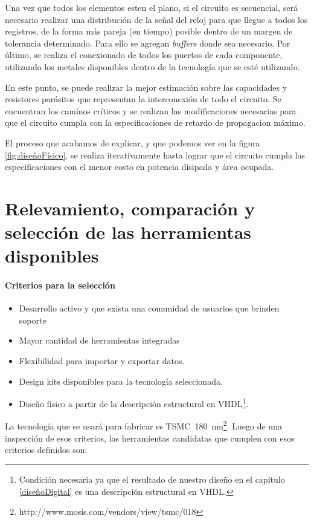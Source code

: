 Una vez que todos los elementos esten el plano, si el circuito es secuencial, será necesario realizar una distribución de la señal del reloj para que llegue a todos los registros, de la forma más pareja (en tiempo) posible dentro de un margen de tolerancia determinado. Para ello se agregan \emph{buffers} donde sea necesario. Por último, se realiza el conexionado de todos los puertos de cada componente, utilizando los metales disponibles dentro de la tecnología que se esté utilizando.

En este punto, se puede realizar la mejor estimación sobre las capacidades y resistores parásitos que representan la interconexión de todo el circuito. Se encuentran los camínos críticos y se realizan las modificaciones necesarias para que el circuito cumpla con la especificaciones de retardo de propagacion máximo.

El proceso que acabamos de explicar, y que podemos ver en la figura \ref{fig:diseñoFísico}, se realiza iterativamente hasta lograr que el circuito cumpla las especificaciones con el menor costo en potencia disipada y área ocupada.


\section{Relevamiento, comparación y selección de las herramientas disponibles}
\paragraph{Criterios para la selección}
\begin{itemize}
\item Desarrollo activo y que exista una comunidad de usuarios que brinden soporte
\item Mayor cantidad de herramientas integradas
\item Flexibilidad para importar y exportar datos. 
\item Design kits disponibles para la tecnología seleccionada.
\item Diseño físico a partir de la descripción estructural en VHDL\footnote{Condición necesaria ya que el resultado de nuestro diseño en el capítulo \ref{diseñoDigital} es una descripción estructural en VHDL.}.
\end{itemize}

La tecnología que se usará para fabricar es TSMC~180~nm\footnote{http://www.mosis.com/vendors/view/tsmc/018}.
Luego de una inspección de esos criterios, las herramientas candidatas que cumplen con esos criterios definidos son:

